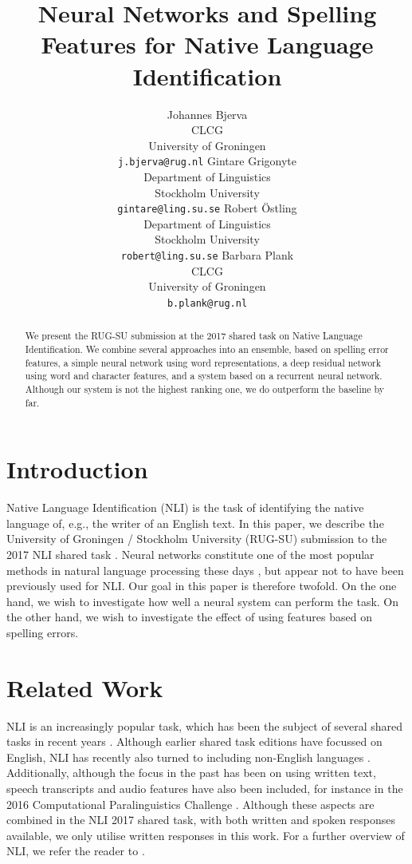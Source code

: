 \documentclass[11pt,letterpaper]{article}
\title{Neural Networks and Spelling Features for Native Language Identification}
\author{Johannes Bjerva \\ CLCG \\ University of Groningen \\ {\tt j.bjerva@rug.nl}
        \And Gintare Grigonyte \\ Department of Linguistics \\ Stockholm University \\ {\tt gintare@ling.su.se}
        \AND Robert {\"O}stling \\ Department of Linguistics \\  Stockholm University \\ {\tt robert@ling.su.se}
        \And Barbara Plank \\ CLCG \\ University of Groningen \\ {\tt b.plank@rug.nl}
}
\date{}
\begin{document}
\maketitle

\begin{abstract}
    We present the RUG-SU submission at the 2017 shared task on Native
    Language Identification.
    We combine several approaches into an ensemble, based on spelling error features, a simple neural network using word representations, a deep residual network using word and character features, and a system based on a recurrent neural network.
    Although our system is not the highest ranking one, we do outperform the baseline by far.
\end{abstract}


\section{Introduction}

Native Language Identification (NLI) is the task of identifying the native language of, e.g., the writer of an English text.
In this paper, we describe the University of Groningen / Stockholm University (RUG-SU) submission to the 2017 NLI shared task \citep{nli2017}.
Neural networks constitute one of the most popular methods in natural language processing these days \citep{manning:2016}, but appear not to have been previously used for NLI.
Our goal in this paper is therefore twofold.
On the one hand, we wish to investigate how well a neural system can perform the task.
On the other hand, we wish to investigate the effect of using features based on spelling errors.

\section{Related Work}

NLI is an increasingly popular task, which has been the subject of several shared tasks in recent years \citep{nli2013,compare2016,nli2017}.
Although earlier shared task editions have focussed on English, NLI has recently also turned to including non-English languages \citep{multilingual-nli}.
Additionally, although the focus in the past has been on using written text, speech transcripts and audio features have also been included, for instance in the 2016 Computational Paralinguistics Challenge \citep{compare2016}.
Although these aspects are combined in the NLI 2017 shared task, with both written and spoken responses available, we only utilise written responses in this work.
For a further overview of NLI, we refer the reader to \citet{malmasi2016}.
\end{document}

